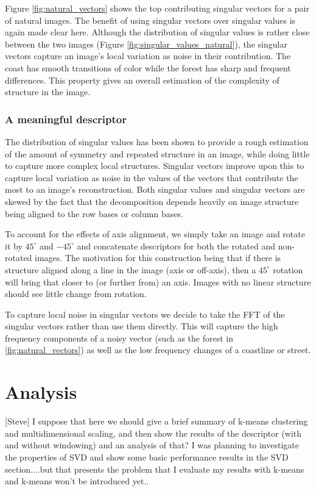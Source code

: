\documentclass{report}
\begin{document}
Figure \ref{fig:natural_vectors} shows the top contributing singular vectors for a pair of natural images. The benefit of using singular vectors over singular values is again made clear here. Although the distribution of singular values is rather close between the two images (Figure \ref{fig:singular_values_natural}), the singular vectors capture an image's local variation as noise in their contribution. The coast has smooth transitions of color while the forest has sharp and frequent differences. This property gives an overall estimation of the complexity of structure in the image.

\subsection{A meaningful descriptor}

The distribution of singular values has been shown to provide a rough estimation of the amount of symmetry and repeated structure in an image, while doing little to capture more complex local structures. Singular vectors improve upon this to capture local variation as noise in the values of the vectors that contribute the most to an image's reconstruction. Both singular values and singular vectors are skewed by the fact that the decomposition depends heavily on image structure being aligned to the row bases or column bases.

To account for the effects of axis alignment, we simply take an image and rotate it by $45^\circ$ and $-45^\circ$ and concatenate descriptors for both the rotated and non-rotated images. The motivation for this construction being that if there is structure aligned along a line in the image (axis or off-axis), then a $45^\circ$ rotation will bring that closer to (or further from) an axis. Images with no linear structure should see little change from rotation.

To capture local noise in singular vectors we decide to take the FFT of the singular vectors rather than use them directly. This will capture the high frequency components of a noisy vector (such as the forest in \ref{fig:natural_vectors}) as well as the low frequency changes of a coastline or street.

\chapter{Analysis}
\label{chap:analysis}
[Steve] I suppose that here we should give a brief summary of k-means clustering and multidimensional scaling, and then show the results of the descriptor (with and without windowing) and an analysis of that? I was planning to investigate the properties of SVD and show some basic performance results in the SVD section....but that presents the problem that I evaluate my results with k-means and k-means won't be introduced yet..
\end{document}

